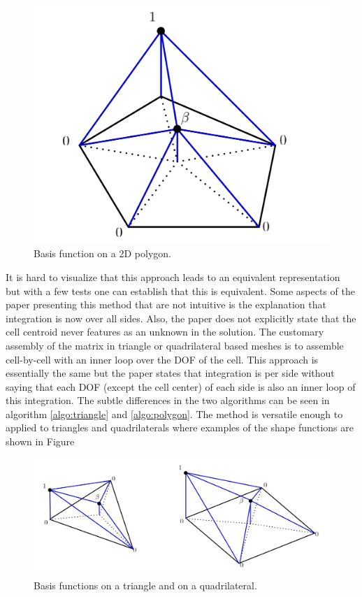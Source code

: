 \documentclass[11pt,letterpaper,titlepage]{article}
\numberwithin{equation}{section}
\begin{document}
\begin{figure}[H]
\centering
\includegraphics[width=0.5\linewidth]{LatexDraw/TwoD_Polygon}
\caption{Basis function on a 2D polygon.}
\label{fig:twodpolygon}
\end{figure}


It is hard to visualize that this approach leads to an equivalent representation but with a few tests one can establish that this is equivalent. Some aspects of the paper presenting this method \cite{BaileyAdamsPWLPolygons} that are not intuitive is the explanation that integration is now over all sides. Also, the paper does not explicitly state that the cell centroid never features as an unknown in the solution. The customary assembly of the matrix in triangle or quadrilateral based meshes is to assemble cell-by-cell with an inner loop over the DOF of the cell. This approach is essentially the same but the paper states that integration is per side without saying that each DOF (except the cell center) of each side is also an inner loop of this integration. The subtle differences in the two algorithms can be seen in algorithm \ref{algo:triangle} and \ref{algo:polygon}.
\newline
\newline
The method is versatile enough to applied to triangles and quadrilaterals where examples of the shape functions are shown in Figure

\begin{figure}[H]
\centering
\includegraphics[width=1.0\linewidth]{LatexDraw/TwoD_PolygonTriQuad}
\caption{Basis functions on a triangle and on a quadrilateral.}
\label{fig:twodpolygontriquad}
\end{figure}
\end{document}
